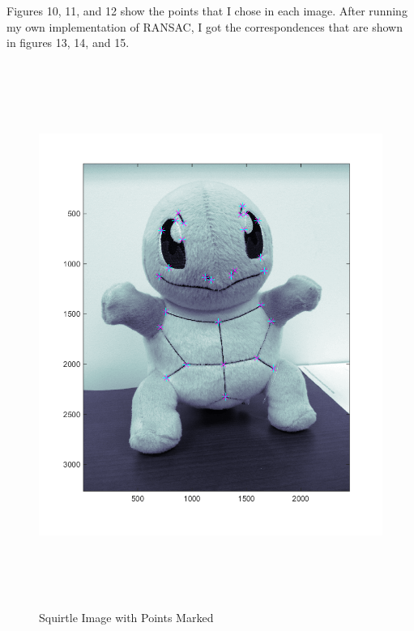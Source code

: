 \documentclass[11pt,psfig]{article}
\begin{document}
Figures 10, 11, and 12 show the points that I chose in each image. After running my own implementation of RANSAC, I got the correspondences that are shown in figures 13, 14, and 15.

\begin{figure}[H]
\centering
\includegraphics[height=7in]{squirtle_prob2Points.png}
\caption{Squirtle Image with Points Marked}
\label{p2a}
\end{figure}
\end{document}
